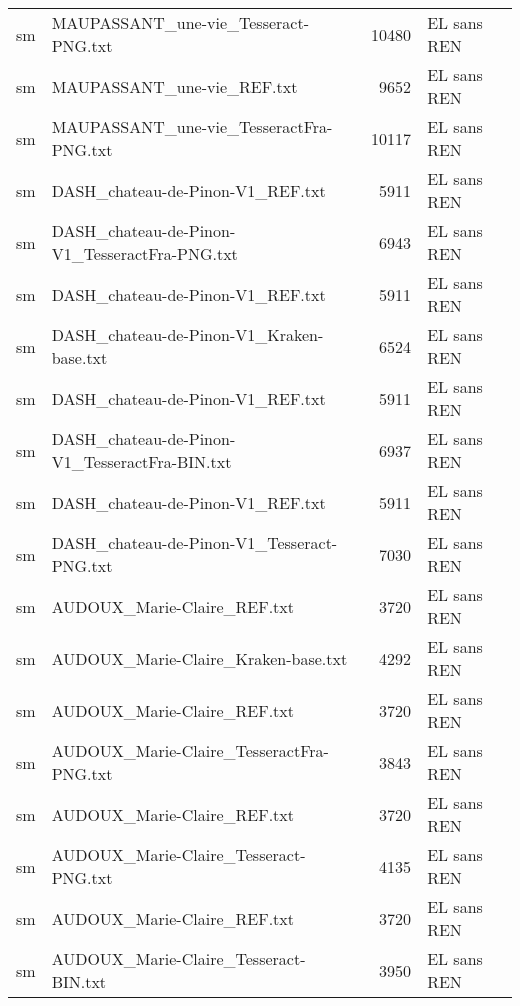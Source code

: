 \begin{tabular}{llrl}
    sm &               MAUPASSANT\_une-vie\_Tesseract-PNG.txt &                 10480 & EL sans REN \\
    sm &                         MAUPASSANT\_une-vie\_REF.txt &                  9652 & EL sans REN \\
    sm &            MAUPASSANT\_une-vie\_TesseractFra-PNG.txt &                 10117 & EL sans REN \\
    sm &                   DASH\_chateau-de-Pinon-V1\_REF.txt &                  5911 & EL sans REN \\
    sm &      DASH\_chateau-de-Pinon-V1\_TesseractFra-PNG.txt &                  6943 & EL sans REN \\
    sm &                   DASH\_chateau-de-Pinon-V1\_REF.txt &                  5911 & EL sans REN \\
    sm &           DASH\_chateau-de-Pinon-V1\_Kraken-base.txt &                  6524 & EL sans REN \\
    sm &                   DASH\_chateau-de-Pinon-V1\_REF.txt &                  5911 & EL sans REN \\
    sm &      DASH\_chateau-de-Pinon-V1\_TesseractFra-BIN.txt &                  6937 & EL sans REN \\
    sm &                   DASH\_chateau-de-Pinon-V1\_REF.txt &                  5911 & EL sans REN \\
    sm &         DASH\_chateau-de-Pinon-V1\_Tesseract-PNG.txt &                  7030 & EL sans REN \\
    sm &                        AUDOUX\_Marie-Claire\_REF.txt &                  3720 & EL sans REN \\
    sm &                AUDOUX\_Marie-Claire\_Kraken-base.txt &                  4292 & EL sans REN \\
    sm &                        AUDOUX\_Marie-Claire\_REF.txt &                  3720 & EL sans REN \\
    sm &           AUDOUX\_Marie-Claire\_TesseractFra-PNG.txt &                  3843 & EL sans REN \\
    sm &                        AUDOUX\_Marie-Claire\_REF.txt &                  3720 & EL sans REN \\
    sm &              AUDOUX\_Marie-Claire\_Tesseract-PNG.txt &                  4135 & EL sans REN \\
    sm &                        AUDOUX\_Marie-Claire\_REF.txt &                  3720 & EL sans REN \\
    sm &              AUDOUX\_Marie-Claire\_Tesseract-BIN.txt &                  3950 & EL sans REN \\

\end{tabular}
